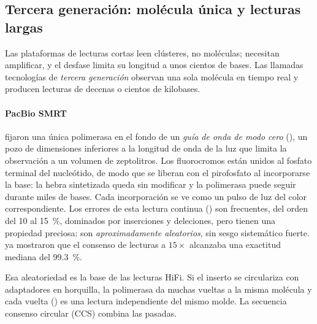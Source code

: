 \subsection{Tercera generación: molécula única y lecturas largas}

Las plataformas de lecturas cortas leen clústeres, no moléculas; necesitan amplificar, y el desfase limita su longitud a unos cientos de bases. Las llamadas tecnologías de \emph{tercera generación} observan una sola molécula en tiempo real y producen lecturas de decenas o cientos de kilobases.

\paragraph{PacBio SMRT} \textcite{c06-eid2009} fijaron una única polimerasa en el fondo de un \emph{guía de onda de modo cero} (), un pozo de dimensiones inferiores a la longitud de onda de la luz que limita la observación a un volumen de zeptolitros. Los fluorocromos están unidos al fosfato terminal del nucleótido, de modo que se liberan con el pirofosfato al incorporarse la base: la hebra sintetizada queda sin modificar y la polimerasa puede seguir durante miles de bases. Cada incorporación se ve como un pulso de luz del color correspondiente. Los errores de esta lectura continua () son frecuentes, del orden del 10 al \SI{15}{\percent}, dominados por inserciones y deleciones, pero tienen una propiedad preciosa: son \emph{aproximadamente aleatorios}, sin sesgo sistemático fuerte. \textcite{c06-eid2009} ya mostraron que el consenso de lecturas a $15\times$ alcanzaba una exactitud mediana del \SI{99,3}{\percent}.

Esa aleatoriedad es la base de las lecturas HiFi. Si el inserto se circulariza con adaptadores en horquilla, la polimerasa da muchas vueltas a la misma molécula y cada vuelta () es una lectura independiente del mismo molde. La secuencia consenso circular (CCS) combina las pasadas.

